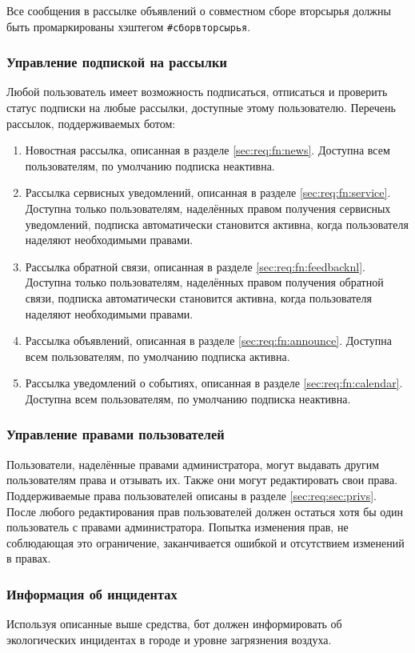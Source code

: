     Все сообщения в рассылке объявлений о совместном сборе вторсырья должны быть промаркированы
    хэштегом \hbox{\texttt{\#сборвторсырья}}.

\subsubsection{Управление подпиской на рассылки}
    \label{sec:req:fn:subscriptions}
    Любой пользователь имеет возможность подписаться, отписаться и проверить статус подписки на
    любые рассылки, доступные этому пользователю. Перечень рассылок, поддерживаемых ботом:
    \begin{enumerate}
        \item
            Новостная рассылка, описанная в разделе \ref{sec:req:fn:news}.
            Доступна всем пользователям, по умолчанию подписка неактивна.
        \item
            Рассылка сервисных уведомлений, описанная в разделе \ref{sec:req:fn:service}.
            Доступна только пользователям, наделённых правом получения сервисных уведомлений,
            подписка автоматически становится активна, когда пользователя
            наделяют необходимыми правами.
        \item
            Рассылка обратной связи, описанная в разделе \ref{sec:req:fn:feedbacknl}.
            Доступна только пользователям, наделённых правом получения обратной связи,
            подписка автоматически становится активна, когда пользователя
            наделяют необходимыми правами.
        \item
            Рассылка объявлений, описанная в разделе \ref{sec:req:fn:announce}.
            Доступна всем пользователям, по умолчанию подписка активна.
        \item
            Рассылка уведомлений о событиях, описанная в разделе \ref{sec:req:fn:calendar}.
            Доступна всем пользователям, по умолчанию подписка неактивна.
    \end{enumerate}

\subsubsection{Управление правами пользователей}
    \label{seq:req:fn:roles}
    Пользователи, наделённые правами администратора, могут выдавать другим
    пользователям права и отзывать их. Также они могут редактировать свои права.
    Поддерживаемые права пользователей описаны в разделе \ref{sec:req:sec:privs}.
    После любого редактирования прав пользователей должен остаться хотя бы один
    пользователь с правами администратора. Попытка изменения прав, не соблюдающая
    это ограничение, заканчивается ошибкой и отсутствием изменений в правах.

\subsubsection{Информация об инцидентах}
    \label{sec:req:fn:incidents}
        Используя описанные выше средства, бот должен информировать об экологических инцидентах
        в городе и уровне загрязнения воздуха.

